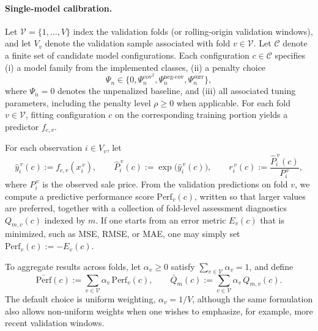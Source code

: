 \documentclass[12pt, draft]{article}
\theoremstyle{plain}
\theoremstyle{definition}
\newcommand{\1}{\mathbf{1}}
\begin{document}
\paragraph{Single-model calibration.}
Let $\mathcal V=\{1,\dots,V\}$ index the validation folds (or rolling-origin validation windows), and let $V_v$ denote the validation sample associated with fold $v\in\mathcal V$. Let $\mathcal C$ denote a finite set of candidate model configurations. Each configuration $c\in\mathcal C$ specifies
(i) a model family from the implemented classes,
(ii) a penalty choice
\[
\Psi_n \in \{0,\Psi_n^{\mathrm{cov}^2},\Psi_n^{\mathrm{neg\mbox{-}cov}},\Psi_n^{\mathrm{surr}}\},
\]
where $\Psi_n=0$ denotes the unpenalized baseline,
and
(iii) all associated tuning parameters, including the penalty level $\rho\ge 0$ when applicable.
For each fold $v\in\mathcal V$, fitting configuration $c$ on the corresponding training portion yields a predictor $f_{c,v}$.

For each observation $i\in V_v$, let
\[
\hat y_i^{\,v}(c):=f_{c,v}(x_i^{\,v}),
\qquad
\hat P_i^{\,v}(c):=\exp\!\bigl(\hat y_i^{\,v}(c)\bigr),
\qquad
r_i^{\,v}(c):=\frac{\hat P_i^{\,v}(c)}{P_i^{\,v}},
\]
where $P_i^{\,v}$ is the observed sale price. From the validation predictions on fold $v$, we compute a predictive performance score $\mathrm{Perf}_v(c)$, written so that larger values are preferred, together with a collection of fold-level assessment diagnostics $Q_{m,v}(c)$ indexed by $m$. If one starts from an error metric $E_v(c)$ that is minimized, such as MSE, RMSE, or MAE, one may simply set $\mathrm{Perf}_v(c):=-E_v(c)$.

To aggregate results across folds, let $\alpha_v\ge 0$ satisfy $\sum_{v\in\mathcal V}\alpha_v=1$, and define
\[
\bar{\mathrm{Perf}}(c):=\sum_{v\in\mathcal V}\alpha_v\,\mathrm{Perf}_v(c),
\qquad
\bar Q_m(c):=\sum_{v\in\mathcal V}\alpha_v\,Q_{m,v}(c).
\]
The default choice is uniform weighting, $\alpha_v=1/V$, although the same formulation also allows non-uniform weights when one wishes to emphasize, for example, more recent validation windows.
\end{document}
